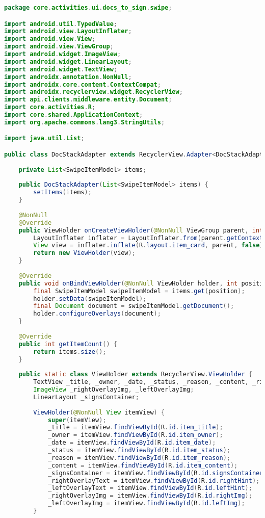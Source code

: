 \begin{lstlisting}[language=Java]
package core.activities.ui.docs_to_sign.swipe;

import android.util.TypedValue;
import android.view.LayoutInflater;
import android.view.View;
import android.view.ViewGroup;
import android.widget.ImageView;
import android.widget.LinearLayout;
import android.widget.TextView;
import androidx.annotation.NonNull;
import androidx.core.content.ContextCompat;
import androidx.recyclerview.widget.RecyclerView;
import api.clients.middleware.entity.Document;
import core.activities.R;
import core.shared.ApplicationContext;
import org.apache.commons.lang3.StringUtils;

import java.util.List;

public class DocStackAdapter extends RecyclerView.Adapter<DocStackAdapter.ViewHolder> {
	
	private List<SwipeItemModel> items;
	
	public DocStackAdapter(List<SwipeItemModel> items) {
		setItems(items);
	}
	
	@NonNull
	@Override
	public ViewHolder onCreateViewHolder(@NonNull ViewGroup parent, int viewType) {
		LayoutInflater inflater = LayoutInflater.from(parent.getContext());
		View view = inflater.inflate(R.layout.item_card, parent, false);
		return new ViewHolder(view);
	}
	
	@Override
	public void onBindViewHolder(@NonNull ViewHolder holder, int position) {
		final SwipeItemModel swipeItemModel = items.get(position);
		holder.setData(swipeItemModel);
		final Document document = swipeItemModel.getDocument();
		holder.configureOverlays(document);
	}
	
	@Override
	public int getItemCount() {
		return items.size();
	}
	
	public static class ViewHolder extends RecyclerView.ViewHolder {
		TextView _title, _owner, _date, _status, _reason, _content, _rightOverlayText, _leftOverlayText;
		ImageView _rightOverlayImg, _leftOverlayImg;
		LinearLayout _signsContainer;
		
		ViewHolder(@NonNull View itemView) {
			super(itemView);
			_title = itemView.findViewById(R.id.item_title);
			_owner = itemView.findViewById(R.id.item_owner);
			_date = itemView.findViewById(R.id.item_date);
			_status = itemView.findViewById(R.id.item_status);
			_reason = itemView.findViewById(R.id.item_reason);
			_content = itemView.findViewById(R.id.item_content);
			_signsContainer = itemView.findViewById(R.id.signsContainer);
			_rightOverlayText = itemView.findViewById(R.id.rightHint);
			_leftOverlayText = itemView.findViewById(R.id.leftHint);
			_rightOverlayImg = itemView.findViewById(R.id.rightImg);
			_leftOverlayImg = itemView.findViewById(R.id.leftImg);
		}
		

\end{lstlisting}
